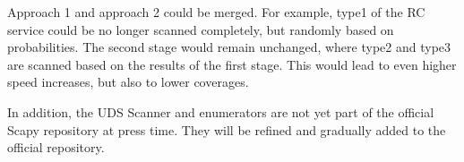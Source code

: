 Approach 1 and approach 2 could be merged. For example, type1 of the RC service could be no longer scanned completely, but randomly based on probabilities. 
The second stage would remain unchanged, where type2 and type3 are scanned based on the results of the first stage. 
This would lead to even higher speed increases, but also to lower coverages.

In addition, the UDS Scanner and enumerators are not yet part of the official Scapy repository at press time. 
They will be refined and gradually added to the official repository.
